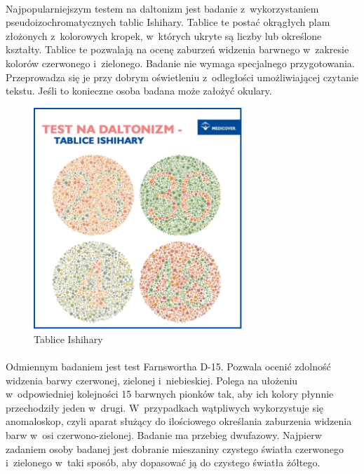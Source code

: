 \documentclass[12pt, letterpaper]{article}
\begin{document}
\paragraph{}
Najpopularniejszym testem na daltonizm jest badanie z~wykorzystaniem pseudoizochromatycznych tablic Ishihary. Tablice te postać okrągłych plam złożonych z~kolorowych kropek, w~których ukryte są liczby lub określone kształty. Tablice te pozwalają na ocenę zaburzeń widzenia barwnego w~zakresie kolorów czerwonego i~zielonego. Badanie nie wymaga specjalnego przygotowania. Przeprowadza się je przy dobrym oświetleniu z~odległości umożliwiającej czytanie tekstu. Jeśli to konieczne osoba badana może założyć okulary.

\begin{figure}[h]
  \centering
      \includegraphics[width=0.7\textwidth]{ishihara}
  \caption{Tablice Ishihary}
\end{figure}

\paragraph{}
Odmiennym badaniem jest test Farnswortha D-15. Pozwala ocenić zdolność widzenia barwy czerwonej, zielonej i~niebieskiej. Polega na ułożeniu w~odpowiedniej kolejności 15 barwnych pionków tak, aby ich kolory płynnie przechodziły jeden w~drugi. W~przypadkach wątpliwych wykorzystuje się anomaloskop, czyli aparat służący do ilościowego określania zaburzenia widzenia barw w~osi czerwono-zielonej. Badanie ma przebieg dwufazowy. Najpierw zadaniem osoby badanej jest dobranie mieszaniny czystego światła czerwonego i~zielonego w~taki sposób, aby dopasować ją do czystego światła żółtego.
\end{document}
